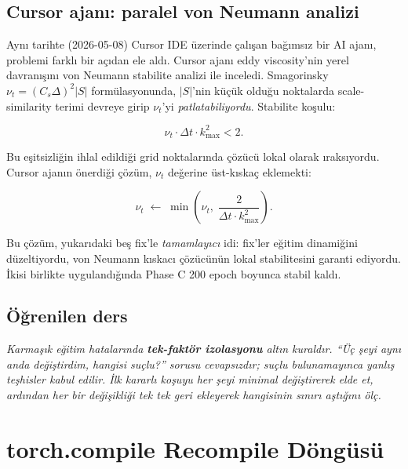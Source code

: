 \subsection*{Cursor ajanı: paralel von Neumann analizi}

Aynı tarihte (2026-05-08) Cursor IDE üzerinde çalışan bağımsız bir AI ajanı, problemi farklı bir açıdan ele aldı. Cursor ajanı eddy viscosity'nin yerel davranışını von Neumann stabilite analizi ile inceledi. Smagorinsky $\nu_t = (C_s \Delta)^2 |S|$ formülasyonunda, $|S|$'nin küçük olduğu noktalarda scale-similarity terimi devreye girip $\nu_t$'yi \textit{patlatabiliyordu}. Stabilite koşulu:

\begin{equation}
    \nu_t \cdot \Delta t \cdot k_{\max}^2 < 2.
    \label{eq:vn_stability}
\end{equation}

Bu eşitsizliğin ihlal edildiği grid noktalarında çözücü lokal olarak ıraksıyordu. Cursor ajanın önerdiği çözüm, $\nu_t$ değerine üst-kıskaç eklemekti:

\begin{equation}
    \nu_t \;\leftarrow\; \min\!\left( \nu_t,\; \frac{2}{\Delta t \cdot k_{\max}^2} \right).
    \label{eq:vn_cap}
\end{equation}

Bu çözüm, yukarıdaki beş fix'le \textit{tamamlayıcı} idi: fix'ler eğitim dinamiğini düzeltiyordu, von Neumann kıskacı çözücünün lokal stabilitesini garanti ediyordu. İkisi birlikte uygulandığında Phase C 200 epoch boyunca stabil kaldı.

\subsection*{Öğrenilen ders}

\begin{remark}
\textit{Karmaşık eğitim hatalarında \textbf{tek-faktör izolasyonu} altın kuraldır. ``Üç şeyi aynı anda değiştirdim, hangisi suçlu?'' sorusu cevapsızdır; suçlu bulunamayınca yanlış teşhisler kabul edilir. İlk kararlı koşuyu \textit{her şeyi minimal değiştirerek} elde et, ardından her bir değişikliği tek tek geri ekleyerek hangisinin sınırı aştığını ölç.}
\end{remark}


\section{torch.compile Recompile Döngüsü}
\label{sec:bug_torchcompile}

